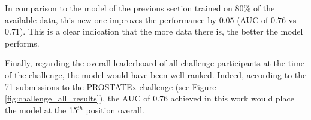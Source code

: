 In comparison to the model of the previous section trained on 80\% of the available data, this new one improves the performance by $0.05$ (AUC of $0.76$ vs $0.71$). This is a clear indication that the more data there is, the better the model performs.

Finally, regarding the overall leaderboard of all challenge participants at the time of the challenge, the model would have been well ranked. Indeed, according to the 71 submissions to the PROSTATEx challenge (see Figure \ref{fig:challenge_all_results}), the AUC of $0.76$ achieved in this work would place the model at the 15$^{th}$ position overall.
